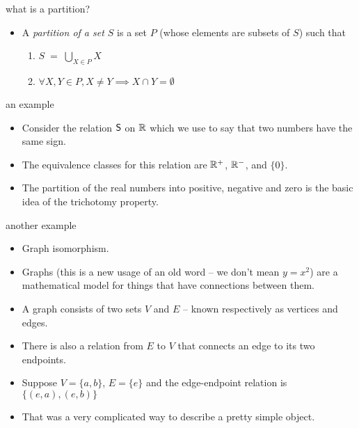 \documentclass[handout,landscape]{beamer}
\begin{document}
\begin{frame}{what is a partition?}
\begin{itemize}
\item A {\em partition of a set $S$} is a set $P$ (whose elements are subsets of $S$) such that \pause
\bigskip

\begin{enumerate}
  \item $ \displaystyle S \; = \; \bigcup_{X \in P} X$ \pause
  \item \rule{0pt}{24pt} $ \displaystyle \forall X, Y \in P, X \neq Y \implies X\cap Y = \emptyset $
\end{enumerate}

\end{itemize}
\end{frame}

\begin{frame}{an example}
\begin{itemize}
\item Consider the relation $\mbox{\textsf S}$ on ${\mathbb R}$ which we use to say that two numbers have the same sign. \pause
\bigskip
\item The equivalence classes for this relation are ${\mathbb R}^+$, ${\mathbb R}^-$, and $\{0\}$. \pause
\item The partition of the real numbers into positive, negative and zero is the basic idea of the trichotomy property.
\end{itemize}
\end{frame}

\begin{frame}{another example}
\begin{itemize}
\item Graph isomorphism. \pause
\bigskip
\item Graphs (this is a new usage of an old word -- we don't mean $y=x^2$) \pause \newline
are a mathematical model for things that have connections between them. \pause
\item A graph consists of two sets $V$ and $E$ -- known respectively as vertices and edges. \pause
\item There is also a relation from $E$ to $V$ that connects an edge to its two endpoints. \pause
\item Suppose $V = \{a, b\}$, $E = \{e \}$ and the edge-endpoint relation is $\{ (e,a), (e,b) \}$ \pause
\item That was a very complicated way to describe a pretty simple object.


\end{itemize}
\end{frame}
\end{document}
